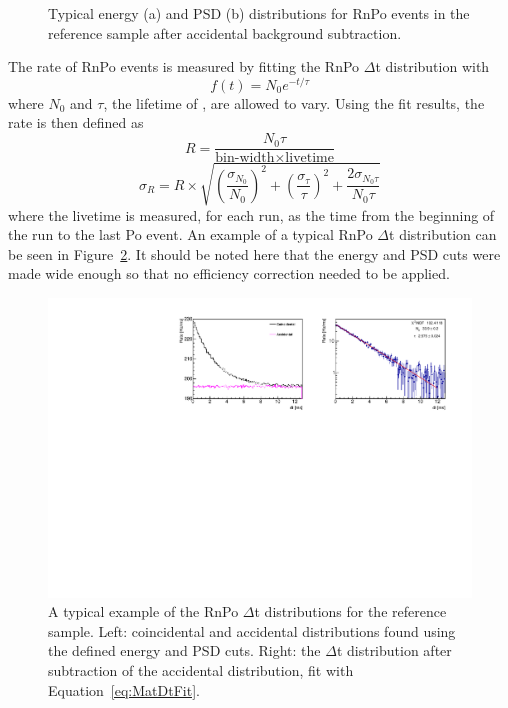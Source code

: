 \begin{figure}[H]
\begin{subfigure}{0.5\linewidth}
		\caption{}
	\end{subfigure}
	\caption[Typical RnPo energy and PSD distributions]{Typical energy (a) and PSD (b) distributions for RnPo events in the reference sample after accidental background subtraction.}
	\label{fig:rnpoenpsd}
\end{figure}

The rate of RnPo events is measured by fitting the RnPo $\Delta$t distribution with
\begin{equation}
	f(t) = N_0e^{-t/\tau}
	\label{eq:MatDtFit}
\end{equation}
where $N_0$ and $\tau$, the lifetime of \Po, are allowed to vary. 
Using the fit results, the rate is then defined as
\begin{equation}
	R = \frac{N_0 \tau}{\textrm{bin-width}\times\textrm{livetime}}
\end{equation}
\begin{equation}
	\sigma_R = R \times \sqrt{  \left(\frac{\sigma_{N_0}}{N_0}\right)^2 + \left(\frac{\sigma_{\tau}}{\tau}\right)^2 + \frac{2\sigma_{N_{0}\tau}}{N_0\tau} }
\end{equation}
where the livetime is measured, for each run, as the time from the beginning of the run to the last Po event. 
An example of a typical RnPo $\Delta$t distribution can be seen in Figure~\ref{fig:rnpodttimebin23s2}. It should be noted here that the energy and PSD cuts were made wide enough so that no efficiency correction needed to be applied.

\begin{figure}[H]
	\centering
	\includegraphics[width=1.\linewidth]{"tex/6-ac227-images/BNL/RnPoDt_TimeBin23_S2"}
	\caption[Typical RnPo $\Delta$t distribution]{A typical example of the RnPo $\Delta$t distributions for the reference sample. Left: coincidental and accidental distributions found using the defined energy and PSD cuts. Right: the $\Delta$t distribution after subtraction of the accidental distribution, fit with Equation~\ref{eq:MatDtFit}.}
	\label{fig:rnpodttimebin23s2}
\end{figure}

